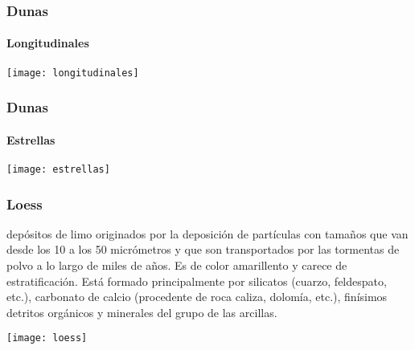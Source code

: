 \documentclass{beamer}
\begin{document}
\begin{frame}
\frametitle{Dunas}
\framesubtitle{Longitudinales}
\begin{center}
\texttt{[image: longitudinales]}
\end{center}
\end{frame}
\begin{frame}
\frametitle{Dunas}
\framesubtitle{Estrellas}
\begin{center}
\texttt{[image: estrellas]}
\end{center}
\end{frame}
\begin{frame}
\frametitle{Loess}
\justifying
\small{depósitos de limo originados por la deposición de partículas con tamaños que van desde los 10 a los 50 micrómetros y que son transportados por las tormentas de polvo a lo largo de miles de años. Es de color amarillento y carece de estratificación. Está formado principalmente por silicatos (cuarzo, feldespato, etc.), carbonato de calcio (procedente de roca caliza, dolomía, etc.), finísimos detritos orgánicos y minerales del grupo de las arcillas.}
\begin{center}
\texttt{[image: loess]}
\end{center}
\end{frame}
\end{document}

